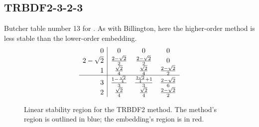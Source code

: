 \documentclass[letterpaper,10pt,english]{sphinxmanual}
\begin{document}
\subsection{TRBDF2-3-2-3}
\label{Butcher:trbdf2-3-2-3}\label{Butcher:butcher-trbdf2}
Butcher table number 13
for {\hyperref[c_interface/User_callable:c.ARKodeSetIRKTableNum]{\emph{}}}.  As with
Billington, here the higher-order method is less stable than the
lower-order embedding.
\begin{gather}
\begin{split}\begin{array}{r|ccc}
  0 & 0 & 0 & 0 \\
  2-\sqrt{2} & \frac{2-\sqrt{2}}{2} & \frac{2-\sqrt{2}}{2} & 0 \\
  1 & \frac{\sqrt{2}}{4} & \frac{\sqrt{2}}{4} & \frac{2-\sqrt{2}}{2} \\
  \hline
  3 & \frac{1-\frac{\sqrt{2}}{4}}{3} & \frac{\frac{3\sqrt{2}}{4}+1}{3} & \frac{2-\sqrt{2}}{6} \\
  2 & \frac{\sqrt{2}}{4} & \frac{\sqrt{2}}{4} & \frac{2-\sqrt{2}}{2}
\end{array}\end{split}\notag
\end{gather}\begin{figure}[htbp]
\centering
\capstart

\caption{Linear stability region for the TRBDF2 method.  The method's
region is outlined in blue; the embedding's region is in red.}\end{figure}
\end{document}
